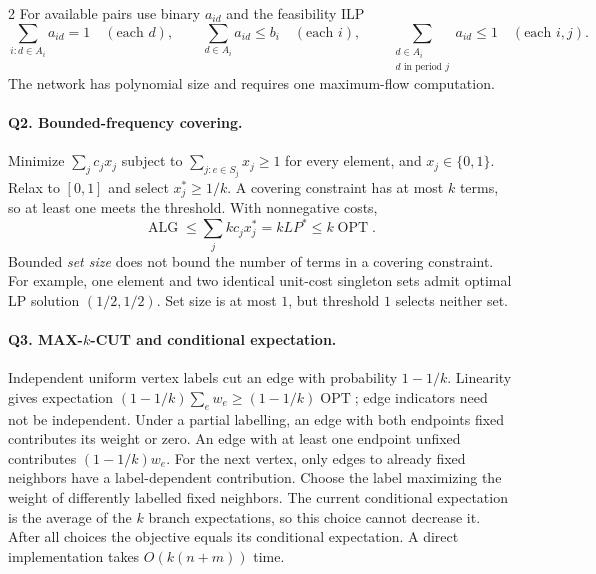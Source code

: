 \documentclass[10pt]{article}
\theoremstyle{definition}
\newcommand{\OPT}{\operatorname{OPT}}
\newcommand{\ALG}{\operatorname{ALG}}
\begin{document}
\begin{multicols*}{2}
For available pairs use binary $a_{id}$ and the feasibility ILP
\[
\sum_{i:d\in A_i}a_{id}=1\quad(\text{each }d),\qquad
\sum_{d\in A_i}a_{id}\le b_i\quad(\text{each }i),\qquad
\sum_{\substack{d\in A_i\\d\text{ in period }j}}a_{id}\le1
\quad(\text{each }i,j).
\]
The network has polynomial size and requires one maximum-flow computation.

\paragraph{Q2. Bounded-frequency covering.}
Minimize $\sum_j c_jx_j$ subject to
$\sum_{j:e\in S_j}x_j\ge1$ for every element, and $x_j\in\{0,1\}$.
Relax to $[0,1]$ and select $x_j^*\ge1/k$.  A covering constraint has at
most $k$ terms, so at least one meets the threshold.  With nonnegative costs,
\[
\ALG\le\sum_j kc_jx_j^*=kLP^*\le k\OPT.
\]
Bounded \emph{set size} does not bound the number of terms in a covering
constraint.  For example, one element and two identical unit-cost singleton
sets admit optimal LP solution $(1/2,1/2)$.  Set size is at most $1$, but
threshold $1$ selects neither set.

\paragraph{Q3. \texorpdfstring{MAX-$k$-CUT}{MAX-k-CUT} and conditional expectation.}
Independent uniform vertex labels cut an edge with probability $1-1/k$.
Linearity gives expectation $(1-1/k)\sum_e w_e\ge(1-1/k)\OPT$; edge
indicators need not be independent.  Under a partial labelling, an edge
with both endpoints fixed contributes its weight or zero.  An edge with
at least one endpoint unfixed contributes $(1-1/k)w_e$.  For the next
vertex, only edges to already fixed neighbors have a label-dependent
contribution.  Choose the label maximizing the weight of differently
labelled fixed neighbors.  The current conditional expectation is the
average of the $k$ branch expectations, so this choice cannot decrease it.
After all choices the objective equals its conditional expectation.
A direct implementation takes $O(k(n+m))$ time.


\end{multicols*}
\end{document}
